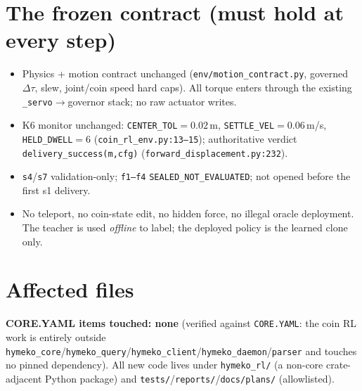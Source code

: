 \documentclass[11pt]{article}
\newcommand{\code}[1]{\texttt{\small #1}}
\begin{document}
\section{The frozen contract (must hold at every step)}
\begin{itemize}[nosep,leftmargin=1.4em]
  \item Physics + motion contract unchanged (\code{env/motion\_contract.py}, governed $\Delta\tau$, slew, joint/coin
  speed hard caps). All torque enters through the existing \code{\_servo}$\to$governor stack; no raw actuator writes.
  \item K6 monitor unchanged: \code{CENTER\_TOL}$=0.02$\,m, \code{SETTLE\_VEL}$=0.06$\,m/s, \code{HELD\_DWELL}$=6$
  (\code{coin\_rl\_env.py:13--15}); authoritative verdict \code{delivery\_success(m,cfg)}
  (\code{forward\_displacement.py:232}).
  \item \code{s4}/\code{s7} validation-only; \code{f1--f4} \code{SEALED\_NOT\_EVALUATED}; not opened before the first
  s1 delivery.
  \item No teleport, no coin-state edit, no hidden force, no illegal oracle deployment. The teacher is used
  \emph{offline} to label; the deployed policy is the learned clone only.
\end{itemize}

\section{Affected files}
\textbf{CORE.YAML items touched: none} (verified against \code{CORE.YAML}: the coin RL work is entirely outside
\code{hymeko\_core}/\code{hymeko\_query}/\code{hymeko\_client}/\code{hymeko\_daemon}/\code{parser} and touches no
pinned dependency). All new code lives under \code{hymeko\_rl/} (a non-core crate-adjacent Python package) and
\code{tests/}/\code{reports/}/\code{docs/plans/} (allowlisted).
\end{document}
